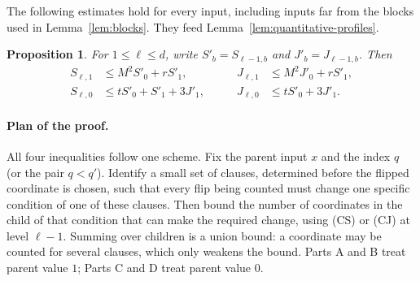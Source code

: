 \documentclass[11pt]{article}
\newtheorem{proposition}[theorem]{Proposition}
\theoremstyle{definition}
\theoremstyle{remark}
\begin{document}
The following estimates hold for every input, including
inputs far from the blocks used in Lemma~\ref{lem:blocks}.
They feed Lemma~\ref{lem:quantitative-profiles}.

\begin{proposition}\label{prop:recurrences}
For $1\leq \ell\leq d$, write
$S'_b=S_{\ell-1,b}$ and $J'_b=J_{\ell-1,b}$.  Then
\begin{equation}\label{eq:recurrences}
\begin{aligned}
 S_{\ell,1}&\leq M^2S'_0+rS'_1,
 &\qquad J_{\ell,1}&\leq M^2J'_0+rS'_1,\\
 S_{\ell,0}&\leq tS'_0+S'_1+3J'_1,
 &\qquad J_{\ell,0}&\leq tS'_0+3J'_1.
\end{aligned}
\end{equation}
\end{proposition}

\paragraph{Plan of the proof.}
All four inequalities follow one scheme.
Fix the parent input \(x\) and the index \(q\) (or the pair \(q<q'\)).
Identify a small set of clauses, determined before the flipped coordinate is chosen, such that every flip being counted must change one specific condition of one of these clauses.
Then bound the number of coordinates in the child of that condition that can make the required change, using (CS) or (CJ) at level \(\ell-1\).
Summing over children is a union bound: a coordinate may be counted for several clauses, which only weakens the bound.
Parts A and B treat parent value \(1\); Parts C and D treat parent value \(0\).
\end{document}
